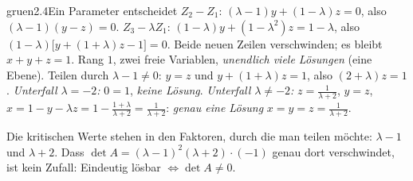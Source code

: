 \begin{loesungkarte}{gruen}{2.4}{Ein Parameter entscheidet}
$Z_2 - Z_1$: $(\lambda - 1)y + (1 - \lambda)z = 0$, also $(\lambda - 1)(y - z) = 0$. $Z_3 - \lambda Z_1$: $(1 - \lambda)y + (1 - \lambda^{2})z = 1 - \lambda$, also $(1 - \lambda)\bigl[y + (1 + \lambda)z - 1\bigr] = 0$.
Beide neuen Zeilen verschwinden; es bleibt $x + y + z = 1$. Rang $1$, zwei freie Variablen, \emph{unendlich viele Lösungen} (eine Ebene).
Teilen durch $\lambda - 1\neq0$: $y = z$ und $y + (1 + \lambda)z = 1$, also $(2 + \lambda)z = 1$.
\emph{Unterfall $\lambda = -2$:} $0 = 1$, \emph{keine Lösung}.
\emph{Unterfall $\lambda\neq-2$:} $z = \frac1{\lambda + 2}$, $y = z$, $x = 1 - y - \lambda z = 1 - \frac{1 + \lambda}{\lambda + 2} = \frac1{\lambda + 2}$: \emph{genau eine Lösung} $x = y = z = \frac1{\lambda + 2}$.
\begin{mitnehmen}\kastentext
Die kritischen Werte stehen in den Faktoren, durch die man teilen möchte: $\lambda - 1$ und $\lambda + 2$. Dass $\det A = (\lambda - 1)^{2}(\lambda + 2)\cdot(-1)$ genau dort verschwindet, ist kein Zufall: Eindeutig lösbar $\iff\det A\neq0$.
\end{mitnehmen}
\end{loesungkarte}

